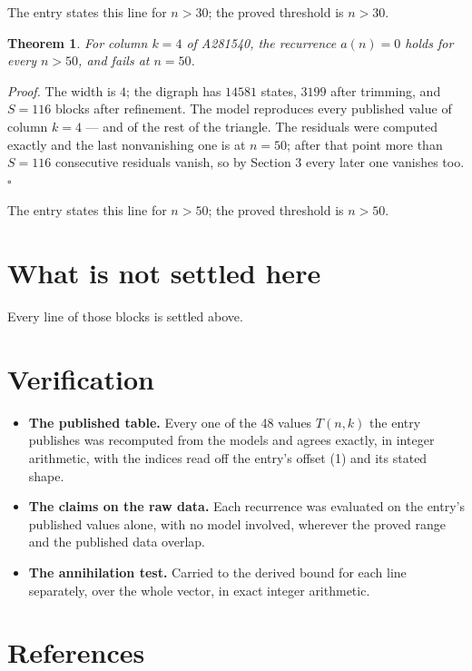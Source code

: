 \documentclass[11pt]{article}
\newtheorem{theorem}{Theorem}
\theoremstyle{definition}
\begin{document}
The entry states this line for $n > 30$; the proved threshold is $n > 30$.

\begin{theorem} For column $k = 4$ of A281540, the recurrence $a(n) = 0$ holds for every $n > 50$, and fails at $n = 50$.\end{theorem}

{\itshape Proof.} The width is $4$; the digraph has $14581$ states, $3199$ after trimming, and $S = 116$ blocks after refinement. The model reproduces every published value of column $k = 4$ --- and of the rest of the triangle. The residuals were computed exactly and the last nonvanishing one is at $n = 50$; after that point more than $S = 116$ consecutive residuals vanish, so by Section 3 every later one vanishes too. $\square$

The entry states this line for $n > 50$; the proved threshold is $n > 50$.

\section{What is not settled here}

Every line of those blocks is settled above.

\section{Verification}

\begin{itemize}

\item {\bfseries The published table.} Every one of the 48 values $T(n,k)$ the entry publishes was recomputed from the models and agrees exactly, in integer arithmetic, with the indices read off the entry's offset (1) and its stated shape.

\item {\bfseries The claims on the raw data.} Each recurrence was evaluated on the entry's published values alone, with no model involved, wherever the proved range and the published data overlap.

\item {\bfseries The annihilation test.} Carried to the derived bound for each line separately, over the whole vector, in exact integer arithmetic.

\end{itemize}

\section{References}
\end{document}
